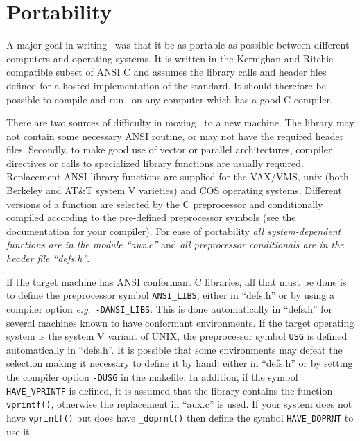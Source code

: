 \section{Portability}
A major goal in writing \moldy\ was that it be as portable as possible
between different computers  and operating systems.  It is  written in
the Kernighan and Ritchie\cite{kernighan:78} compatible subset of ANSI
C and assumes the library calls and header files  defined for a hosted
implementation of the  standard.  It  should therefore be possible  to
compile and run \moldy\ on any computer which has a good C compiler.

There are two sources of difficulty in moving \moldy\  to a new machine.
The library may not contain some necessary ANSI routine, or
may not have the required header files.  Secondly, to make good use of
vector or parallel architectures, compiler directives or calls to
specialized library functions are usually required.
Replacement ANSI library functions are supplied for the VAX/VMS,
unix (both Berkeley and AT\&T system V varieties) and COS operating
systems.  Different versions of a function are selected by the C
preprocessor and conditionally compiled according to the pre-defined
preprocessor symbols (see the documentation for your compiler).  For
ease of portability {\em all system-dependent functions are in the
module ``aux.c''} and {\em all preprocessor conditionals are in the
header file ``defs.h''}.

If the target machine has ANSI conformant C libraries, all that must
be done is to define the preprocessor symbol \verb+ANSI_LIBS+, either
in ``defs.h'' or by using a compiler option {\em e.g}.\
\verb+-DANSI_LIBS+.  This is done automatically in ``defs.h'' for
several machines known to have conformant environments.  If the target
operating system is the system V variant of UNIX, the preprocessor
symbol \verb'USG' is defined automatically in ``defs.h''.  It is
possible that some environments may defeat the selection making it
necessary to define it by hand, either in ``defs.h'' or by setting
the compiler option \verb'-DUSG' in the makefile. In addition, if the
symbol \verb'HAVE_VPRINTF' is defined, it is assumed that the library
contains the function \verb'vprintf()', otherwise the replacement in
``aux.c'' is used. If your system does not have \verb'vprintf()' but
does have \verb'_doprnt()' then define the symbol \verb'HAVE_DOPRNT'
to use it.

